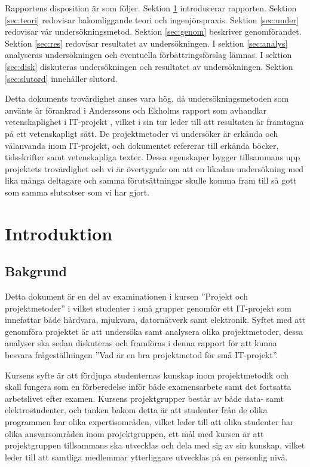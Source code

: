 \documentclass[conference,a4paper]{IEEEtran}
\begin{document}
Rapportens disposition är som följer. Sektion \ref{sec:intro} introducerar rapporten. Sektion \ref{sec:teori} redovisar bakomliggande teori och ingenjörspraxis. Sektion \ref{sec:under} redovisar vår undersökningsmetod. Sektion \ref{sec:genom} beskriver genomförandet. Sektion \ref{sec:res} redovisar resultatet av undersökningen. I sektion \ref{sec:analys} analyseras undersökningen och eventuella förbättringsförslag lämnas. I sektion \ref{sec:disk} diskuteras undersökningen och resultatet av undersökningen. Sektion \ref{sec:slutord} innehåller slutord.

Detta dokuments trovärdighet anses vara hög, då undersökningsmetoden som använts är förankrad i Anderssons och Ekholms rapport som avhandlar vetenskaplighet i IT-projekt \cite{Andersson02}, vilket i sin tur leder till att resultaten är framtagna på ett vetenskapligt sätt. De projektmetoder vi undersöker är erkända och välanvanda inom IT-projekt, och dokumentet refererar till erkända böcker, tidsskrifter samt vetenskapliga texter. Dessa egenskaper bygger tillsammans upp projektets trovärdighet och vi är övertygade om att en likadan undersökning med lika många deltagare och samma förutsättningar skulle komma fram till så gott som samma slutsatser som vi har gjort.

\section{Introduktion} \label{sec:intro}

\subsection{Bakgrund}
Detta dokument är en del av examinationen i kursen ''Projekt och projektmetoder'' i vilket studenter i små grupper genomför ett IT-projekt som innefattar både hårdvara, mjukvara, datornätverk samt elektronik. Syftet med att genomföra projektet är att undersöka samt analysera olika projektmetoder, dessa analyser ska sedan diskuteras och framföras i denna rapport för att kunna besvara frågeställningen ''Vad är en bra projektmetod för små IT-projekt''.

Kursens syfte är att fördjupa studenternas kunskap inom projektmetodik och skall fungera som en förberedelse inför både examensarbete samt det fortsatta arbetslivet efter examen. Kursens projektgrupper består av både data- samt elektrostudenter, och tanken bakom detta är att studenter från de olika programmen har olika expertisområden, vilket leder till att olika studenter har olika ansvarsområden inom projektgruppen, ett mål med kursen är att projektgruppen tillsammans ska utvecklas och dela med sig av sin kunskap, vilket leder till att samtliga medlemmar ytterliggare utvecklas på en personlig nivå.
\end{document}
